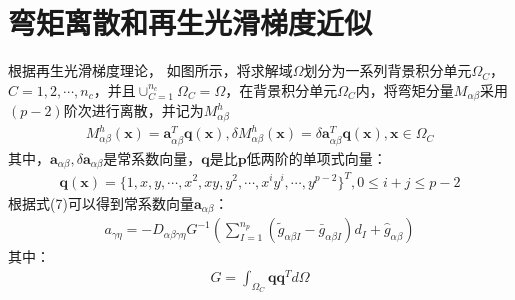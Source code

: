\documentclass[a4paper]{article}
\begin{document}
\section{弯矩离散和再生光滑梯度近似}
根据再生光滑梯度理论，
如图所示，将求解域$\Omega$划分为一系列背景积分单元$\Omega_C$，$C=1,2,\dotsb,n_c$，并且$\cup_{C=1}^{n_c}\Omega_C=\Omega$，在背景积分单元$\Omega_C$内，将弯矩分量$M_{\alpha\beta}$采用$(p-2)$阶次进行离散，并记为$M_{\alpha\beta}^h$
\begin{equation}
\begin{split}
    M_{\alpha\beta}^h(\pmb{x})=\pmb{a}^T_{\alpha\beta}\pmb{q}(\pmb{x}),\delta M_{\alpha\beta}^h(\pmb{x})=\delta \pmb{a}^T_{\alpha\beta}\pmb{q}(\pmb{x}),\pmb{x}\in\Omega_C
\end{split}
\end{equation}
其中，$\pmb a_{\alpha\beta},\delta \pmb a_{\alpha\beta}$是常系数向量，$\pmb{q}$是比$\pmb{p}$低两阶的单项式向量：
\begin{equation}
\begin{split}
    \pmb{q}(\pmb{x})=\{1,x,y,\dotsb,x^2,xy,y^2,\dotsb,x^iy^i,\dotsb,y^{p-2}\}^T,0\le i+j\le p-2
\end{split}
\end{equation}
根据式(7)可以得到常系数向量$\pmb{a}_{\alpha\beta}$：
\begin{equation}
\begin{split}
    a_{\gamma\eta}=-D_{\alpha\beta\gamma\eta}G^{-1}(\sum_{I=1}^{n_p}(\tilde{g}_{\alpha\beta I}-\bar{g}_{\alpha\beta I})d_I+\hat{g}_{\alpha\beta})
\end{split}
\end{equation}
其中：
\begin{equation}
\begin{split}
    G=\int_{\Omega_C}\pmb{q}\pmb{q}^Td\Omega
\end{split}
\end{equation}
\end{document}

